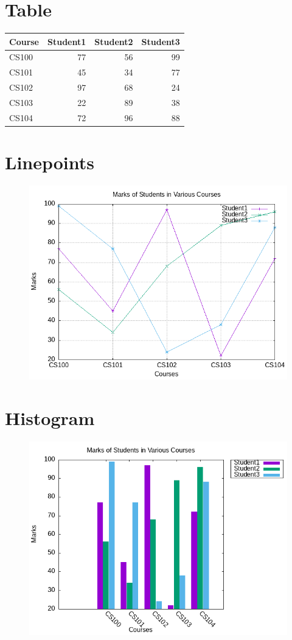 \documentclass{article}
\begin{document}
	\section*{Table}
	\begin{tabular}{|l|r|r|r|} \hline
		Course & Student1 & Student2 & Student3   \\\hline
		CS100 & 77 & 56 & 99 \\ \hline
		CS101 & 45 & 34 & 77 \\ \hline
		CS102 & 97 & 68 & 24 \\ \hline
		CS103 & 22 & 89 & 38 \\ \hline
		CS104 & 72 & 96 & 88 \\ \hline
	\end{tabular}
	
	\section*{Linepoints}
		\begin{figure}[h]
			\centering
			\includegraphics[width=0.7\linewidth]{Linespoint}
			\caption{}
			\label{fig:linespoint}
		\end{figure}

	\section*{Histogram}
		\begin{figure}[h]
			\centering
			\includegraphics[width=0.7\linewidth]{Histogram}
			\caption{}
			\label{fig:histogram}
		\end{figure}
\end{document}
